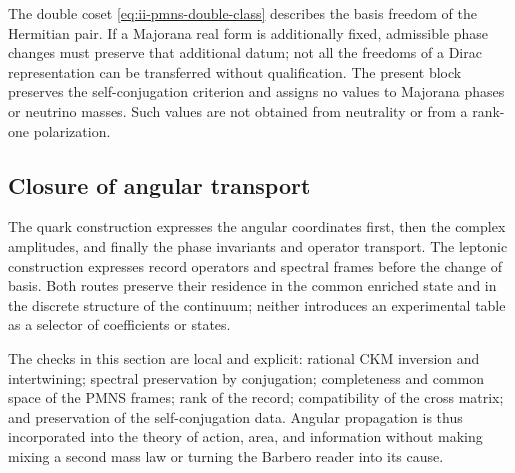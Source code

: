\begin{remark}
The double coset \eqref{eq:ii-pmns-double-class} describes the basis
freedom of the Hermitian pair. If a Majorana real form is additionally fixed,
admissible phase changes must preserve that additional datum;
not all the freedoms of a Dirac representation can be transferred
without qualification. The present block preserves the self-conjugation criterion and
assigns no values to Majorana phases or neutrino masses. Such values
are not obtained from neutrality or from a rank-one polarization.
\end{remark}

\subsection{Closure of angular transport}

The quark construction expresses the angular coordinates first, then
the complex amplitudes, and finally the phase invariants and
operator transport. The leptonic construction expresses record
operators and spectral frames before the change of basis. Both routes
preserve their residence in the common enriched state and in the discrete
structure of the continuum; neither introduces an experimental table as
a selector of coefficients or states.

The checks in this section are local and explicit: rational CKM inversion and
intertwining; spectral preservation by conjugation;
completeness and common space of the PMNS frames; rank of the record;
compatibility of the cross matrix; and preservation of the self-conjugation
data. Angular propagation is thus incorporated into the theory of
action, area, and information without making mixing a second mass
law or turning the Barbero reader into its cause.

